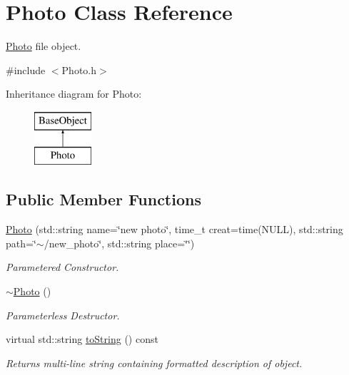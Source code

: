 \hypertarget{classPhoto}{\section{Photo Class Reference}
\label{classPhoto}
}


\hyperlink{classPhoto}{Photo} file object.  




{\ttfamily \#include $<$Photo.\-h$>$}

Inheritance diagram for Photo\-:\begin{figure}[H]
\begin{center}
\leavevmode
\includegraphics[height=2.000000cm]{classPhoto}
\end{center}
\end{figure}
\subsection*{Public Member Functions}
\begin{DoxyCompactItemize}
\item 
\hypertarget{classPhoto_a77533515f74784f105299a7fe911833a}{\hyperlink{classPhoto_a77533515f74784f105299a7fe911833a}{Photo} (std\-::string name=\char`\"{}new photo\char`\"{}, time\-\_\-t creat=time(N\-U\-L\-L), std\-::string path=\char`\"{}$\sim$/new\-\_\-photo\char`\"{}, std\-::string place=\char`\"{}\char`\"{})}\label{classPhoto_a77533515f74784f105299a7fe911833a}

\begin{DoxyCompactList}\small\item\em Parametered Constructor. \end{DoxyCompactList}\item 
\hyperlink{classPhoto_adc366234be6226600360c7cbba8e7fcf}{$\sim$\-Photo} ()
\begin{DoxyCompactList}\small\item\em Parameterless Destructor. \end{DoxyCompactList}\item 
\hypertarget{classPhoto_a72a86fd925fedd420e4367a529ed72cb}{virtual std\-::string \hyperlink{classPhoto_a72a86fd925fedd420e4367a529ed72cb}{to\-String} () const }\label{classPhoto_a72a86fd925fedd420e4367a529ed72cb}

\begin{DoxyCompactList}\small\item\em Returns multi-\/line string containing formatted description of object. \end{DoxyCompactList}\end{DoxyCompactItemize}


